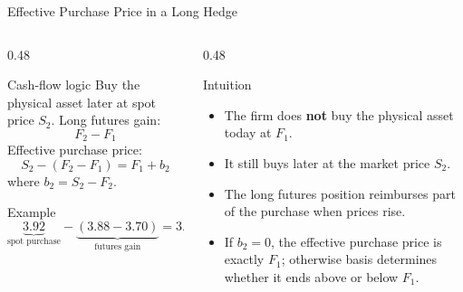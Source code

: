 \documentclass[aspectratio=169,11pt]{beamer}
\begin{document}
\begin{frame}{Effective Purchase Price in a Long Hedge}
    \small
    \begin{columns}[T]
        \begin{column}{0.48\textwidth}
            \begin{block}{Cash-flow logic}
                Buy the physical asset later at spot price \(S_2\).
                Long futures gain:
                \[
                    F_2-F_1
                \]
                Effective purchase price:
                \[
                    S_2-(F_2-F_1)=F_1+b_2
                \]
                where \(b_2=S_2-F_2\).
            \end{block}

            \begin{exampleblock}{Example}
                \[
                    \underbrace{3.92}_{\text{spot purchase}}
                    -
                    \underbrace{(3.88-3.70)}_{\text{futures gain}}
                    =
                    3.74
                \]
            \end{exampleblock}
        \end{column}
        \begin{column}{0.48\textwidth}
            \begin{alertblock}{Intuition}
                \begin{itemize}
                    \item The firm does \textbf{not} buy the physical asset today at \(F_1\).
                    \item It still buys later at the market price \(S_2\).
                    \item The long futures position reimburses part of the purchase when prices rise.
                    \item If \(b_2=0\), the effective purchase price is exactly \(F_1\); otherwise basis determines whether it ends above or below \(F_1\).
                \end{itemize}
            \end{alertblock}
        \end{column}
    \end{columns}
\end{frame}
\end{document}
